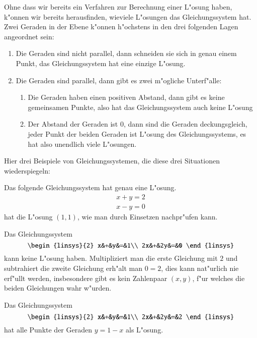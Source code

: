 Ohne dass wir bereits ein Verfahren zur Berechnung einer
L"osung haben, k"onnen wir bereits herausfinden, wieviele
L"osungen das Gleichungssystem hat. Zwei Geraden in der Ebene
k"onnen h"ochstens in den drei folgenden Lagen angeordnet sein:
\begin{enumerate}
\item Die Geraden sind nicht parallel, dann schneiden sie sich in
genau einem Punkt, das Gleichungssystem hat eine einzige L"osung.
\item Die Geraden sind parallel, dann gibt es zwei m"ogliche Unterf"alle:
\begin{enumerate}
\item Die Geraden haben einen positiven Abstand, dann gibt es keine
gemeinsamen Punkte, also hat das Gleichungssystem auch keine L"osung
\item Der Abstand der Geraden ist $0$, dann sind die Geraden deckungsgleich,
jeder Punkt der beiden Geraden ist L"osung des Gleichungssystems, es hat
also unendlich viele L"osungen.
\end{enumerate}
\end{enumerate}
Hier drei Beispiele von Gleichungssystemen, die diese drei Situationen
wiederspiegeln:
\begin{beispiel}
Das folgende Gleichungssystem hat genau eine L"osung.
\begin{align*}
x+y=2\\
x-y=0
\end{align*}
hat die L"osung $(1,1)$, wie man durch Einsetzen nachpr"ufen kann.
\end{beispiel}
\begin{beispiel}
Das Gleichungssystem
$$
\begin{linsys}{2}
x&+&y&=&1\\
2x&+&2y&=&0
\end{linsys}
$$
kann keine L"osung haben. Multipliziert man die erste Gleichung mit $2$
und subtrahiert die zweite Gleichung erh"alt man $0=2$, dies kann nat"urlich
nie erf"ullt werden, insbesondere gibt es kein Zahlenpaar $(x,y)$, f"ur
welches die beiden Gleichungen wahr w"urden.
\end{beispiel}
\begin{beispiel}
Das Gleichungssystem
$$
\begin{linsys}{2}
x&+&y&=&1\\
2x&+&2y&=&2
\end{linsys}
$$
hat alle Punkte der Geraden $y=1-x$ als L"osung.
\end{beispiel}

